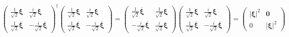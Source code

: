 \documentclass[aps, preprint]{revtex4}
\begin{document}
\begin{equation}\left (\begin{array}{cc}\frac{1}{\sqrt{2}} \mathbf{\xi } & \frac{i}{\sqrt{2}} \mathbf{\xi } \\
\frac{1}{\sqrt{2}} \overline{\mathbf{\xi }} &  -\frac{i}{\sqrt{2}} \overline{\mathbf{\xi }}\end{array}\right )^{ \dag } \left (\begin{array}{cc}\frac{1}{\sqrt{2}} \mathbf{\xi } & \frac{i}{\sqrt{2}} \mathbf{\xi } \\
\frac{1}{\sqrt{2}} \overline{\mathbf{\xi }} &  -\frac{i}{\sqrt{2}} \overline{\mathbf{\xi }}\end{array}\right ) =\left (\begin{array}{cc}\frac{1}{\sqrt{2}} \overline{\mathbf{\xi }} & \frac{1}{\sqrt{2}} \mathbf{\xi } \\
 -\frac{i}{\sqrt{2}} \overline{\mathbf{\xi }} & \frac{i}{\sqrt{2}} \mathbf{\xi }\end{array}\right ) \left (\begin{array}{cc}\frac{1}{\sqrt{2}} \mathbf{\xi } & \frac{i}{\sqrt{2}} \mathbf{\xi } \\
\frac{1}{\sqrt{2}} \overline{\mathbf{\xi }} &  -\frac{i}{\sqrt{2}} \overline{\mathbf{\xi }}\end{array}\right ) =\left (\begin{array}{cc}\left \vert \mathbf{\xi }\right \vert ^{2} & \mathbf{0} \\
0 & \left \vert \mathbf{\xi }\right \vert ^{2}\end{array}\right )
\end{equation}
\end{document}
